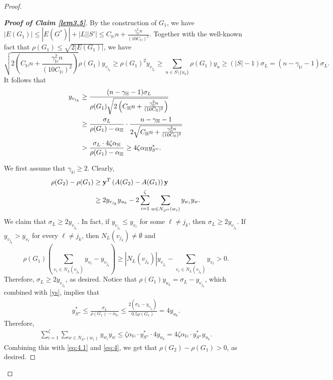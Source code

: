 \documentclass[11pt, a4paper]{article}
\theoremstyle{definition}
\newcommand{\<}{\subseteq}
\begin{document}
\begin{proof}
\begin{proof}[\bf Proof of Claim \ref{lem3.5}]
By the construction of
$G_1$, we have $|E(G_1)|\leq |E(G^*)|+|L||S'|\leq C_\mathbb{H} n+\frac{\gamma_\mathbb{H}^2n}{(10C_\mathbb{H})^2}$. Together with the well-known fact that 
$\rho(G_1)\leq \sqrt{2|E(G_1)|}$, we have 
$$
\sqrt{2\left(C_\mathbb{H} n+\frac{\gamma_\mathbb{H}^2n}{(10C_\mathbb{H})^2}\right)}\rho(G_1)y_{v_{j_k}}\geq \rho(G_1)^2y_{v_{j_k}}\geq \sum_{u\in S\setminus \{u_k\}}\rho(G_1)y_u\geq (|S|-1)\sigma_L=(n-\gamma_\mathbb{H}-1)\sigma_L.
$$
It follows that 
\begin{align}\notag
    y_{v_{j_k}}&\geq \frac{(n-\gamma_\mathbb{H}-1)\sigma_L}{\rho(G_1)\sqrt{2\left(C_\mathbb{H} n+\frac{\gamma_\mathbb{H}^2n}{(10C_\mathbb{H})^2}\right)}}\\\notag
    &\geq \frac{\sigma_L}{\rho(G_1)-\alpha_{\mathbb{H}}}\cdot\frac{n-\gamma_\mathbb{H}-1}{2\sqrt{C_\mathbb{H} n+\frac{\gamma_\mathbb{H}^2n}{(10C_\mathbb{H})^2}}}\\\label{eq:4.1}
    &>\frac{\sigma_L\cdot 4\zeta\alpha_{\mathbb{H}}}{\rho(G_1)-\alpha_{\mathbb{H}}}\geq 4\zeta\alpha_{\mathbb{H}}y_{S''}^*.
\end{align}

    We first assume that $\gamma_\mathbb{H}\geq2$. Clearly, 
    \begin{align}\notag\label{eq:4}
        \rho(G_2)-\rho(G_1)&\geq{\bf y}^T\left(A(G_2)-A(G_1)\right){\bf y}\\&\geq 2y_{v_{j_k}}y_{u_k}-2\sum_{i=1}^{\zeta}\sum_{w\in N_{S''}(w_i)}y_{w_i}y_w.
    \end{align}
We claim that $\sigma_L\geq 2y_{v_{j_k}}$. In fact, if $y_{v_{j_k}}\leq y_{v_{\ell}}$ for some $\ell\neq j_k$, then $\sigma_L\geq 2y_{v_{j_k}}$. If $y_{v_{j_k}}> y_{v_{\ell}}$ for every  $\ell\neq j_k$, then $N_L(v_{j_k})\neq \emptyset$ and  
$$
\rho(G_1)\left(\sum_{v_\ell\in N_L(v_{j_k})}y_{v_\ell}-y_{v_{j_k}}\right)\geq |N_L(v_{j_k})|y_{v_{j_k}}-\sum_{v_\ell\in N_L(v_{j_k})}y_{v_\ell}>0.
$$
Therefore, $\sigma_L\geq 2y_{v_{j_k}}$, as desired. 
Notice that $\rho(G_1)y_{u_k}=\sigma_L-y_{v_{j_k}}$, %
which combined with \eqref{ys}, implies that  
\begin{align*}
y_{S''}^*\leq\frac{\sigma_L}{\rho(G_1)-\alpha_\mathbb{H}}\leq\frac{2(\sigma_L-y_{v_{j_k}})}{0.5\rho(G_1)}=4y_{u_k}.
\end{align*}
   Therefore, %
    \begin{align*}
        \sum_{i=1}^{\zeta}\sum_{w\in N_{S''}(w_i)}y_{w_i}y_w\leq\zeta\alpha_\mathbb{H}\cdot y_{S''}^*\cdot4y_{u_k}=4\zeta\alpha_\mathbb{H}\cdot y_{S''}^*y_{u_k}.
    \end{align*}
Combining this with \eqref{eq:4.1} and \eqref{eq:4}, we get that $\rho(G_2)-\rho(G_1)>0$, as desired. 
    

\end{proof}
\end{proof}
\end{document}
